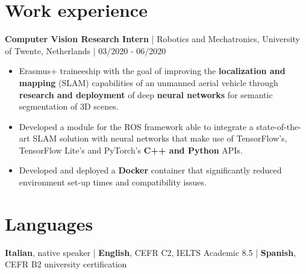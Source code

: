 \documentclass[10pt, a4paper]{extarticle}
\begin{document}
\section*{Work experience}
\textbf{Computer Vision Research Intern} | Robotics and Mechatronics, University of Twente, Netherlands | 03/2020 - 06/2020

\begin{itemize}
  \item Erasmus+ traineeship with the goal of improving the \textbf{localization and mapping} (SLAM) capabilities of an unmanned aerial vehicle through \textbf{research and deployment} of deep \textbf{neural networks} for semantic segmentation of 3D scenes.
  \item Developed a module for the ROS framework able to integrate a state-of-the-art SLAM solution with neural networks that make use of TensorFlow's, TensorFlow Lite's and PyTorch's \textbf{C++ and Python} APIs.
  \item Developed and deployed a \textbf{Docker} container that significantly reduced environment set-up times and compatibility issues.
\end{itemize}

\section*{Languages}

\textbf{Italian}, native speaker | \textbf{English}, CEFR C2, IELTS Academic 8.5 | \textbf{Spanish}, CEFR B2 university certification
\end{document}
